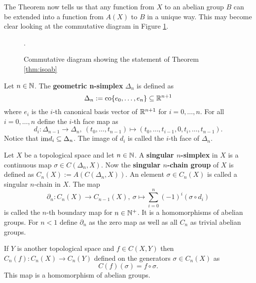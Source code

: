 The Theorem now tells us that any function from $X$ to an abelian group $B$ can be extended into a function from $A(X)$ to $B$ in a unique way. This may become clear looking at the commutative diagram in Figure \ref{fig:com1}.

\begin{figure}[h!]
  \centering
  \caption{Commutative diagram showing the statement of Theorem \ref{thm:isoab}}.\label{fig:com1}
\end{figure}

\begin{defin}
  Let $n\in\mathbb{N}$. The \textbf{geometric n-simplex} $\Delta_n$ is defined as
  \begin{equation*}
    \Delta_n := {\rm co}\{e_0, \ldots, e_n\} \subseteq \mathbb{R}^{n+1}
  \end{equation*}
  where $e_i$ is the $i$-th canonical basis vector of $\mathbb{R}^{n+1}$ for $i = 0,\ldots,n$. For all $i = 0, \ldots, n$ define the $i$-th face map as
  \begin{equation*}
    d_i\colon \Delta_{n-1} \to \Delta_n,\: (t_0,\ldots,t_{n-1}) \mapsto (t_0, \ldots, t_{i-1}, 0, t_i, \ldots, t_{n-1}).
  \end{equation*}
  Notice that ${\rm im} d_i \subseteq \Delta_n$. The image of $d_i$ is called the $i$-th face of $\Delta_n$.
\end{defin}

\begin{defin}
  Let $X$ be a topological space and let $n\in \mathbb{N}$. A \textbf{singular $n$-simplex} in $X$ is a continuous map $\sigma \in C(\Delta_n, X)$.
  Now the \textbf{singular $n$-chain group} of $X$ is defined as $C_n(X) := A(C(\Delta_n, X))$. An element $\sigma \in C_n(X)$ is called a singular $n$-chain in $X$.
  The map \[\partial_n\colon C_n(X) \to C_{n-1}(X),\: \sigma \mapsto \sum\limits_{i=0}^n(-1)^i(\sigma \circ d_i)\] is called the $n$-th boundary map for $n\in\mathbb{N}^+$. It is a homomorphisms of abelian groups. For $n < 1$ define $\partial_n$ as the zero map as well as all $C_n$ as trivial abelian groups.

  If $Y$ is another topological space and $f \in C(X, Y)$ then $C_n(f)\colon C_n(X) \to C_n(Y)$ defined on the generators $\sigma \in C_n(X)$ as
  \begin{equation*}
    C(f)(\sigma) = f \circ \sigma.
  \end{equation*}
  This map is a homomorphism of abelian groups.
\end{defin}

